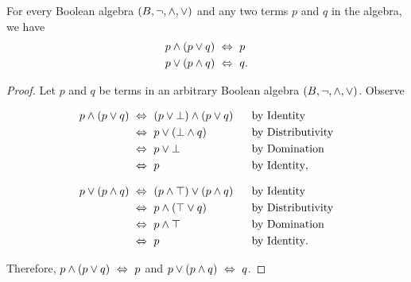 \begin{theorem}[Absorption]
    For every Boolean algebra $(B, \neg, \wedge, \vee)$ and any two terms $p$ and $q$ in the algebra,
    we have
    \begin{align*}
        p \wedge (p \vee q) &~\Leftrightarrow~ p\\
        p \vee (p \wedge q) &~\Leftrightarrow~ q.
    \end{align*}
\end{theorem}
\begin{proof}
    Let $p$ and $q$ be terms in an arbitrary Boolean algebra $(B, \neg, \wedge, \vee)$.
    Observe

    \begin{minipage}{.45\linewidth}
        \vspace{-\parskip-\abovedisplayskip}
        \begin{alignat*}{2}
            p \wedge (p \vee q) &~\Leftrightarrow~ (p \vee \bot) \wedge (p \vee q)~~&&\text{by Identity}\\
                                &~\Leftrightarrow~ p \vee (\bot \wedge q) &&\text{by Distributivity}\\
                                &~\Leftrightarrow~ p \vee \bot &&\text{by Domination}\\
                                &~\Leftrightarrow~ p &&\text{by Identity},
        \end{alignat*}
    \end{minipage}%
    \hfill\vline\hfill
    \begin{minipage}{.45\linewidth}
        \vspace{-\parskip-\abovedisplayskip}
        \begin{alignat*}{2}
            p \vee (p \wedge q) &~\Leftrightarrow~ (p \wedge \top) \vee (p \wedge q)~~&&\text{by Identity}\\
                                &~\Leftrightarrow~ p \wedge (\top \vee q) &&\text{by Distributivity}\\
                                &~\Leftrightarrow~ p \wedge \top &&\text{by Domination}\\
                                &~\Leftrightarrow~ p &&\text{by Identity}.
        \end{alignat*}
    \end{minipage}

    Therefore, $p \wedge (p \vee q) ~\Leftrightarrow~ p$ and $p \vee (p \wedge q) ~\Leftrightarrow~ q$.
\end{proof}

